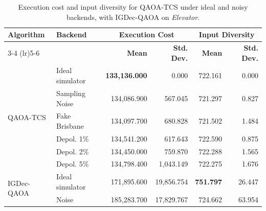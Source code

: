 \begin{table}[ht]
\centering
\caption{Execution cost and input diversity for QAOA-TCS under ideal and noisy backends, with IGDec-QAOA on \textit{Elevator}.}
\label{tab:elevator_effmetrics}
\scriptsize
\begin{tabular}{llrrrr}
\toprule
\textbf{Algorithm} & \textbf{Backend} & 
\multicolumn{2}{c}{\textbf{Execution Cost}} & 
\multicolumn{2}{c}{\textbf{Input Diversity}} \\
\cmidrule(lr){3-4} \cmidrule(lr){5-6}
 & & \textbf{Mean} & \textbf{Std. Dev.} & \textbf{Mean} & \textbf{Std. Dev.} \\
\midrule
\multirow{6}{*}{QAOA-TCS} 
  & Ideal simulator & \textbf{133,136.000} & 0.000    & 722.161 & 0.000 \\
  & Sampling Noise   & 134,086.900 & 567.045  & 721.297 & 0.827 \\
  & Fake Brisbane   & 134,097.700 & 680.828  & 721.502 & 1.484 \\
  & Depol. 1\%      & 134,541.200 & 617.643  & 722.590 & 0.875 \\
  & Depol. 2\%      & 134,450.000 & 759.870  & 722.288 & 1.565 \\
  & Depol. 5\%      & 134,798.400 & 1,043.149 & 722.275 & 1.676 \\
\midrule
\multirow{2}{*}{IGDec-QAOA}
  & Ideal simulator & 171,895.600 & 19,856.754 & \textbf{751.797} & 26.447 \\
  & Noise           & 185,283.700 & 17,829.767 & 724.662 & 63.954 \\
\bottomrule
\end{tabular}
\end{table}

